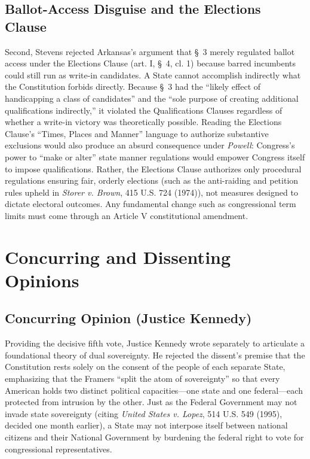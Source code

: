 \documentclass[12pt]{article}
\begin{document}
\subsection{Ballot-Access Disguise and the Elections Clause}
Second, Stevens rejected Arkansas's argument that \S~3 merely regulated ballot access under the Elections Clause (art. I, \S~4, cl. 1) because barred incumbents could still run as write-in candidates. A State cannot accomplish indirectly what the Constitution forbids directly. Because \S~3 had the ``likely effect of handicapping a class of candidates'' and the ``sole purpose of creating additional qualifications indirectly,'' it violated the Qualifications Clauses regardless of whether a write-in victory was theoretically possible. Reading the Elections Clause's ``Times, Places and Manner'' language to authorize substantive exclusions would also produce an absurd consequence under \textit{Powell}: Congress's power to ``make or alter'' state manner regulations would empower Congress itself to impose qualifications. Rather, the Elections Clause authorizes only procedural regulations ensuring fair, orderly elections (such as the anti-raiding and petition rules upheld in \textit{Storer v. Brown}, 415 U.S. 724 (1974)), not measures designed to dictate electoral outcomes. Any fundamental change such as congressional term limits must come through an Article V constitutional amendment.

\section{Concurring and Dissenting Opinions}

\subsection{Concurring Opinion (Justice Kennedy)}
Providing the decisive fifth vote, Justice Kennedy wrote separately to articulate a foundational theory of dual sovereignty. He rejected the dissent's premise that the Constitution rests solely on the consent of the people of each separate State, emphasizing that the Framers ``split the atom of sovereignty'' so that every American holds two distinct political capacities---one state and one federal---each protected from intrusion by the other. Just as the Federal Government may not invade state sovereignty (citing \textit{United States v. Lopez}, 514 U.S. 549 (1995), decided one month earlier), a State may not interpose itself between national citizens and their National Government by burdening the federal right to vote for congressional representatives.
\end{document}
